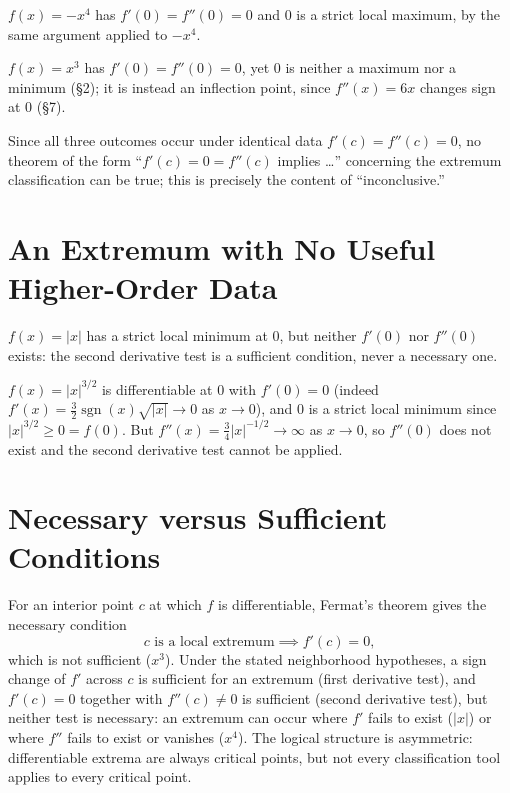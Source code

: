 \documentclass{essay}
\begin{document}
\begin{example}
\(f(x)=-x^4\) has \(f'(0)=f''(0)=0\) and \(0\) is a strict local maximum, by
the same argument applied to \(-x^4\).
\end{example}

\begin{example}
\(f(x)=x^3\) has \(f'(0)=f''(0)=0\), yet \(0\) is neither a maximum nor a
minimum (\S 2); it is instead an inflection point, since \(f''(x)=6x\)
changes sign at \(0\) (\S 7).
\end{example}

Since all three outcomes occur under identical data \(f'(c)=f''(c)=0\), no
theorem of the form ``\(f'(c)=0=f''(c)\) implies \dots'' concerning the
extremum classification can be true; this is precisely the content of
``inconclusive.''

\section{An Extremum with No Useful Higher-Order Data}

\begin{example}
\(f(x)=|x|\) has a strict local minimum at \(0\), but neither \(f'(0)\) nor
\(f''(0)\) exists: the second derivative test is a sufficient condition,
never a necessary one.
\end{example}

\begin{example}
\(f(x)=|x|^{3/2}\) is differentiable at \(0\) with \(f'(0)=0\)
(indeed \(f'(x)=\tfrac32\operatorname{sgn}(x)\sqrt{|x|}\to0\) as
\(x\to0\)), and \(0\) is a strict local minimum since
\(|x|^{3/2}\geq0=f(0)\). But
\(f''(x)=\tfrac34|x|^{-1/2}\to\infty\) as \(x\to0\), so \(f''(0)\) does not
exist and the second derivative test cannot be applied.
\end{example}

\section{Necessary versus Sufficient Conditions}

For an interior point \(c\) at which \(f\) is differentiable, Fermat's
theorem gives the necessary condition
\[
c \text{ is a local extremum} \implies f'(c)=0,
\]
which is not sufficient (\(x^3\)). Under the stated neighborhood
hypotheses, a sign change of \(f'\) across \(c\) is sufficient for an
extremum (first derivative test), and \(f'(c)=0\) together with
\(f''(c)\neq0\) is sufficient (second derivative test), but neither test
is necessary: an extremum can occur where \(f'\) fails to exist (\(|x|\))
or where \(f''\) fails to exist or vanishes (\(x^4\)). The logical
structure is asymmetric: differentiable extrema are always critical points,
but not every classification tool applies to every critical point.
\end{document}
